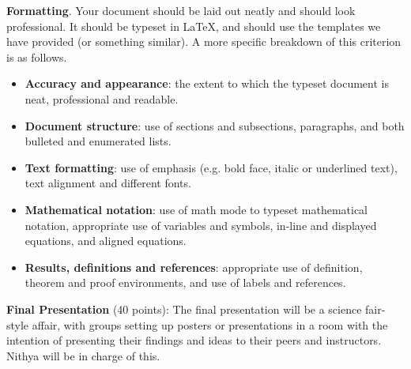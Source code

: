 \documentclass{article}
\begin{document}
\begin{itemize}
\begin{itemize}
        \textbf{Formatting}. Your document should be laid out neatly and should look professional. It should be typeset in \LaTeX, and should use the templates we have provided (or something similar). A more specific breakdown of this criterion is as follows.
        \begin{itemize}
            \item \textbf{Accuracy and appearance}: the extent to which the typeset document is neat, professional and readable.
            \item \textbf{Document structure}: use of sections and subsections, paragraphs, and both bulleted and enumerated lists.
            \item \textbf{Text formatting}: use of emphasis (e.g. bold face, italic or underlined text), text alignment and different fonts.
            \item \textbf{Mathematical notation}: use of math mode to typeset mathematical notation, appropriate use of variables and symbols, in-line and displayed equations, and aligned equations.
            \item \textbf{Results, definitions and references}: appropriate use of definition, theorem and proof environments, and use of labels and references.
        \end{itemize}
    \end{itemize}
    

    \textbf{Final Presentation} (40 points): The final presentation will be a science fair-style affair, with groups setting up posters or presentations in a room with the intention of presenting their findings and ideas to their peers and instructors. Nithya will be in charge of this.
\end{itemize}
\end{document}
